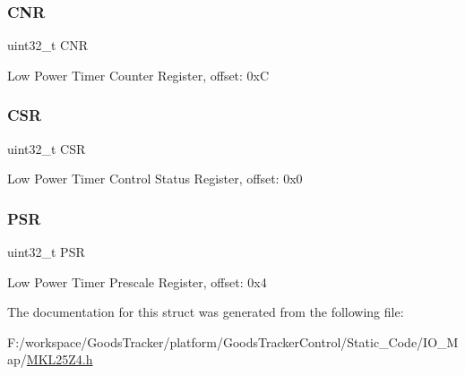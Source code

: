 \subsubsection{\texorpdfstring{C\+NR}{CNR}}
{\footnotesize\ttfamily uint32\+\_\+t C\+NR}

Low Power Timer Counter Register, offset\+: 0xC \mbox{\label{struct_l_p_t_m_r___mem_map_a9f762945117456968eec12c384b1b4e1}} 
\subsubsection{\texorpdfstring{C\+SR}{CSR}}
{\footnotesize\ttfamily uint32\+\_\+t C\+SR}

Low Power Timer Control Status Register, offset\+: 0x0 \mbox{\label{struct_l_p_t_m_r___mem_map_a72127a2e703db8406742669d5cbd7f90}} 
\subsubsection{\texorpdfstring{P\+SR}{PSR}}
{\footnotesize\ttfamily uint32\+\_\+t P\+SR}

Low Power Timer Prescale Register, offset\+: 0x4 

The documentation for this struct was generated from the following file\+:\begin{DoxyCompactItemize}
\item 
F\+:/workspace/\+Goods\+Tracker/platform/\+Goods\+Tracker\+Control/\+Static\+\_\+\+Code/\+I\+O\+\_\+\+Map/\hyperlink{_m_k_l25_z4_8h}{M\+K\+L25\+Z4.\+h}\end{DoxyCompactItemize}
